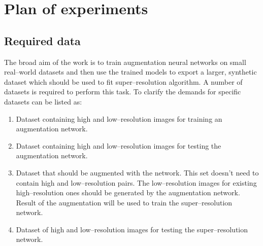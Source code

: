 \section{Plan of experiments}
\subsection{Required data}
The broad aim of the work is to train augmentation neural networks on small real--world datasets and then use the trained models to export a larger, synthetic dataset which should be used to fit super--resolution algorithm.
A number of datasets is required to perform this task.
To clarify the demands for specific datasets can be listed as:
\begin{enumerate}
	\item Dataset containing high and low--resolution images for training an augmentation network.
	\item Dataset containing high and low--resolution images for testing the augmentation network.
	\item Dataset that should be augmented with the network.
	      This set doesn't need to contain high and low--resolution pairs.
	      The low--resolution images for existing high--resolution ones should be generated by the augmentation network.
	      Result of the augmentation will be used to train the super--resolution network.
	 \item Dataset of high and low--resolution images for testing the super--resolution network.
\end{enumerate}

